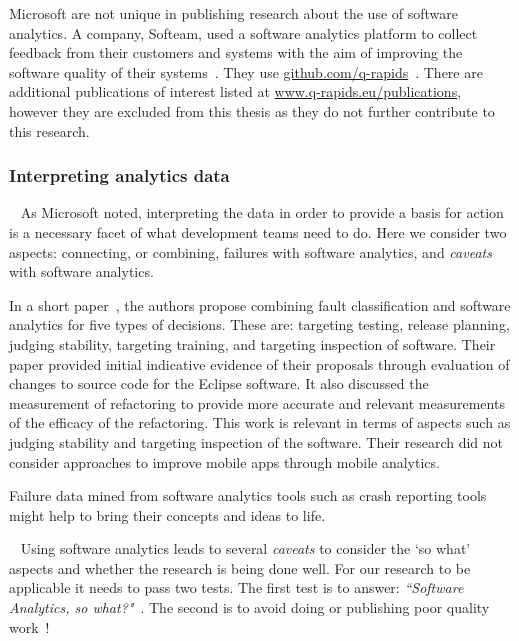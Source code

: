 Microsoft are not unique in publishing research about the use of software analytics. A company, Softeam, used a software analytics platform to collect feedback from their customers and systems with the aim of improving the software quality of their systems~. They use \href{https://github.com/q-rapids}{github.com/q-rapids}~. There are additional publications of interest listed at \href{https://www.q-rapids.eu/publications}{www.q-rapids.eu/publications}, however they are excluded from this thesis as they do not further contribute to this research.


\subsubsection{Interpreting analytics data}~\label{rw-interpreting-analytics-data-research}
As Microsoft noted, interpreting the data in order to provide a basis for action is a necessary facet of what development teams need to do. Here we consider two aspects: connecting, or combining, failures with software analytics, and \emph{caveats} with software analytics.

In a short paper~, the authors propose combining fault classification and software analytics for five types of decisions. These are: targeting testing, release planning, judging stability, targeting training, and targeting inspection of software. Their paper provided initial indicative evidence of their proposals through evaluation of changes to source code for the Eclipse software. It also discussed the measurement of refactoring to provide more accurate and relevant measurements of the efficacy of the refactoring. This work is relevant in terms of aspects such as judging stability and targeting inspection of the software. Their research did not consider approaches to improve mobile apps through mobile analytics. 

Failure data mined from software analytics tools such as crash reporting tools might help to bring their concepts and ideas to life.

{}~\label{rw-caveats-with-software-analytics-topic}
Using software analytics leads to several \emph{caveats} to consider the `so what' aspects and whether the research is being done well. For our research to be applicable it needs to pass two tests. The first test is to answer: 
\emph{``Software Analytics, so what?"}~. The second is to avoid doing or publishing poor quality work~!


